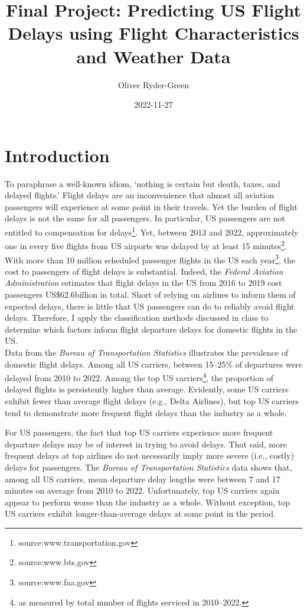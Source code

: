 \documentclass[
]{article}
\title{Final Project: Predicting US Flight Delays using Flight
Characteristics and Weather Data}
\author{Oliver Ryder-Green}
\date{2022-11-27}
\begin{document}
\maketitle

\clearpage

\section{Introduction}

To paraphrase a well-known idiom, `nothing is certain but death, taxes,
and delayed flights.' Flight delays are an inconvenience that almost all
aviation passengers will experience at some point in their travels. Yet
the burden of flight delays is not the same for all passengers. In
particular, US passengers are not entitled to compensation for
delays\footnote{source:www.transportation.gov}. Yet, between 2013 and
2022, approximately one in every five flights from US airports was
delayed by at least 15 minutes\footnote{source:www.bts.gov}. With more
than 10 million scheduled passenger flights in the US each
year\footnote{source:www.faa.gov}, the cost to passengers of flight
delays is substantial. Indeed, the
\textit{Federal Aviation Administration} estimates that flight delays in
the US from 2016 to 2019 cost passengers US\$62.6billion in total. Short
of relying on airlines to inform them of expected delays, there is
little that US passengers can do to reliably avoid flight delays.
Therefore, I apply the classification methods discussed in class to
determine which factors inform flight departure delays for domestic
flights in the US.\\

Data from the \textit{Bureau of Transportation Statistics} illustrates
the prevalence of domestic flight delays. Among all US carriers, between
15--25\% of departures were delayed from 2010 to 2022. Among the top US
carriers\footnote{as measured by total number of flights serviced in 2010--2022.},
the proportion of delayed flights is persistently higher than average.
Evidently, some US carriers exhibit fewer than average flight delays
(e.g., Delta Airlines), but top US carriers tend to demonstrate more
frequent flight delays than the industry as a whole.

For US passengers, the fact that top US carriers experience more
frequent departure delays may be of interest in trying to avoid delays.
That said, more frequent delays at top airlines do not necessarily imply
more severe (i.e., costly) delays for passengers. The
\textit{Bureau of Transportation Statistics} data shows that, among all
US carriers, mean departure delay lengths were between 7 and 17 minutes
on average from 2010 to 2022. Unfortunately, top US carriers again
appear to perform worse than the industry as a whole. Without exception,
top US carriers exhibit longer-than-average delays at some point in the
period.
\end{document}
